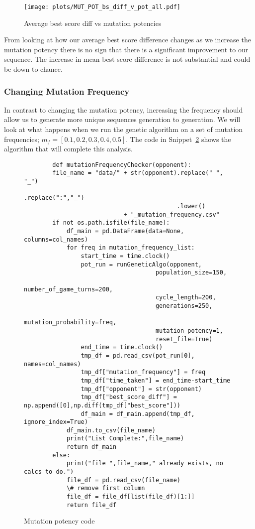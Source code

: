 \begin{figure}[ht] 
\texttt{[image: plots/MUT\_POT\_bs\_diff\_v\_pot\_all.pdf]}
\caption{Average best score diff vs mutation potencies}\label{fig:MUT-POT-bs-diff-v-pot-all}
\end{figure}

From looking at how our average best score difference changes as we increase the mutation potency there is no sign that there is a significant improvement to our sequence.
The increase in mean best score difference is not substantial and could be down to chance.

\subsubsection{Changing Mutation Frequency}
In contrast to changing the mutation potency, increasing the frequency should allow us to generate more unique sequences generation to generation.
We will look at what happens when we run the genetic algorithm on a set of mutation frequencies; \(m_f = [0.1,0.2,0.3,0.4,0.5]\).
The code in Snippet~\ref{code:mutationFrequencyChecker} shows the algorithm that will complete this analysis.\\

\begin{figure}[ht] 
    \begin{verbatim}
        def mutationFrequencyChecker(opponent):
        file_name = "data/" + str(opponent).replace(" ", "_")
                                           .replace(":","_")
                                           .lower()
                            + "_mutation_frequency.csv"
        if not os.path.isfile(file_name):
            df_main = pd.DataFrame(data=None, columns=col_names)  
            for freq in mutation_frequency_list:
                start_time = time.clock()
                pot_run = runGeneticAlgo(opponent,
                                     population_size=150,
                                     number_of_game_turns=200,
                                     cycle_length=200, 
                                     generations=250,
                                     mutation_probability=freq,
                                     mutation_potency=1,
                                     reset_file=True)
                end_time = time.clock()
                tmp_df = pd.read_csv(pot_run[0], names=col_names)
                tmp_df["mutation_frequency"] = freq
                tmp_df["time_taken"] = end_time-start_time
                tmp_df["opponent"] = str(opponent)
                tmp_df["best_score_diff"] = np.append([0],np.diff(tmp_df["best_score"]))
                df_main = df_main.append(tmp_df, ignore_index=True)
            df_main.to_csv(file_name)
            print("List Complete:",file_name)
            return df_main 
        else:
            print("file ",file_name," already exists, no calcs to do.")
            file_df = pd.read_csv(file_name) 
            \# remove first column
            file_df = file_df[list(file_df)[1:]]
            return file_df 
    \end{verbatim}
    \caption{Mutation potency code}\label{code:mutationFrequencyChecker}    
\end{figure}

